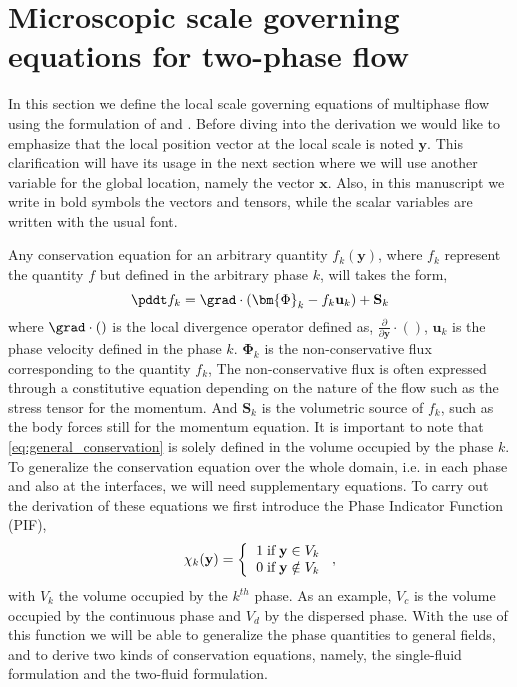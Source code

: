 
\section{Microscopic scale governing equations for two-phase flow}
\label{sec:conservation_laws}

In this section we define the local scale governing equations of multiphase flow using the formulation of \citet{kataoka1986local} and \citet{drew1983mathematical}. 
Before diving into the derivation we would like to emphasize that the local position vector at the local scale is noted $\textbf{y}$.
This clarification will have its usage in the next section where we will use another variable for the global location, namely the vector $\textbf{x}$. 
Also, in this manuscript we write in bold symbols the vectors and tensors, while the scalar variables are written with the usual font. 

Any conservation equation for an arbitrary quantity $f_k(\textbf{y})$, where $f_k$ represent the quantity $f$ but defined in the arbitrary phase $k$, will takes the form,
\begin{equation}
    \pddt f_k
    = \grad \cdot \left(
        \bm{\Phi}_k
        - f_k\textbf{u}_k
        \right)
    + \textbf{S}_k
    \label{eq:general_conservation}
\end{equation}
where $\grad\cdot()$ is the local divergence operator defined as, $\frac{\partial}{\partial \textbf{y}}\cdot()$, $\textbf{u}_k$ is the phase velocity defined in the phase $k$. 
$\bm{\Phi}_k$ is the non-conservative flux corresponding to the quantity $f_k$,
The non-conservative flux is often expressed through a constitutive equation depending on the nature of the flow such as the stress tensor for the momentum. 
And $\textbf{S}_k$ is the volumetric source of $f_k$, such as the body forces still for the momentum equation.
It is important to note that \ref{eq:general_conservation} is solely defined in the volume occupied by the phase $k$.
To generalize the conservation equation over the whole domain, i.e. in each phase and also at the interfaces, we will need supplementary equations. 
To carry out the derivation of these equations we first introduce the Phase Indicator Function (PIF),
\begin{equation}
    \chi_k(\textbf{y}) =  \left\{
      \begin{tabular}{cc}
        $1 \;\text{if} \;\textbf{y} \in V_k$\\
        $0 \;\text{if} \;\textbf{y} \notin V_k$
      \end{tabular}
      \right.,
      \label{eq:phase_indicator}
\end{equation}
with $V_k$ the volume occupied by the $k^{th}$ phase.
As an example, $V_c$ is the volume occupied by the continuous phase and $V_d$ by the dispersed phase. 
With the use of this function we will be able to generalize the phase quantities to general fields, and to derive two kinds of conservation equations, namely, the single-fluid formulation and the two-fluid formulation. 

